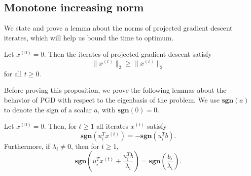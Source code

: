 \documentclass[11pt]{article}
\begin{document}
\subsection{Monotone increasing norm}
We state and prove a lemma about the norms of projected gradient descent iterates, which will help us bound the time to optimum.
\begin{prop}\label{prop:increasing-norm}
Let $x^{(0)} = 0$. Then the iterates of projected gradient descent satisfy
\begin{equation} \label{eqn:incr-norm}
\|x^{(t)}\|_2 \geq \|x^{(t)}\|_2
\end{equation}
for all $t \geq 0$.
\end{prop}
Before proving this proposition, we prove the following lemmas about the behavior of PGD with respect to the eigenbasis of the problem. We use
$\mathbf{sgn}(a)$ to denote the sign of a scalar $a$, with $\mathbf{sgn}(0) = 0$.
\begin{lem}
Let $x^{(0)} = 0$. Then, for $t \geq 1$ all iterates $x^{(t)}$ satisfy
\begin{equation}\label{eqn:sign1}
\mathbf{sgn}(u_i^Tx^{(t)}) = -\mathbf{sgn}(u_i^Tb).
\end{equation}
Furthermore, if $\lambda_i \neq 0$, then for $t \geq 1$,
\begin{equation}
\mathbf{sgn}\left(u_i^Tx^{(t)} + \frac{u_i^Tb}{\lambda_i}\right) = \mathbf{sgn}\left( \frac{b_i}{\lambda_i}\right).
\end{equation}
\end{lem}
\end{document}
